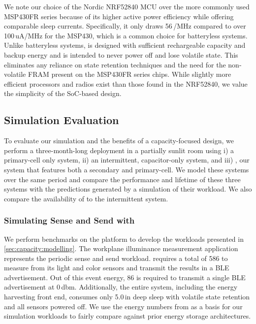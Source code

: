 We note our choice of the Nordic NRF52840 MCU over the more commonly used MSP430FR series
because of its higher active power efficiency while offering comparable sleep currents.
Specifically, it only draws 56\,\uA/MHz compared to over 100\,uA/MHz
for the MSP430, which is a common choice for batteryless systems. 
Unlike batteryless systems,
\name is designed with sufficient rechargeable capacity and backup energy and is intended to never power off and lose volatile state. 
This eliminates any reliance on state retention techniques and the need for the non-volatile FRAM present on the MSP430FR series chips. 
While
slightly more efficient
processors and radios exist than those found in the NRF52840,
we value the simplicity of the SoC-based design. 

\subsection{Simulation Evaluation}
\label{sec:eval}
To evaluate our simulation and the benefits of a capacity-focused design, 
we perform a three-month-long deployment in a partially sunlit room
using i) a primary-cell only system, ii) an intermittent, capacitor-only system, and iii) \name, our
system that features both a secondary and primary-cell. 
We model these
systems over the same period and compare the performance and lifetime of these three systems with the predictions generated by a simulation of their workload. We also compare the availability of \name to the intermittent system.

\subsubsection{Simulating Sense and Send with \name}
We perform benchmarks on the \name platform to develop the workloads presented in \cref{sec:capacity:modelling}.
The workplane illuminance measurement application represents the periodic sense and send workload.
\name requires a total of 586\ssi{\micro\joule} to measure from its light and color sensors and transmit
the results in a BLE advertisement.
Out of this event energy, 86\ssi{\micro\joule}
is required to transmit a single BLE advertisement at 0\,dbm. 
Additionally, the entire system, including
the energy harvesting front end, consumes only 5.0\,\uW in deep sleep with volatile state  
retention and all sensors powered off. 
We use the energy numbers from \name as a basis
for our simulation workloads to fairly compare against prior energy storage architectures.


